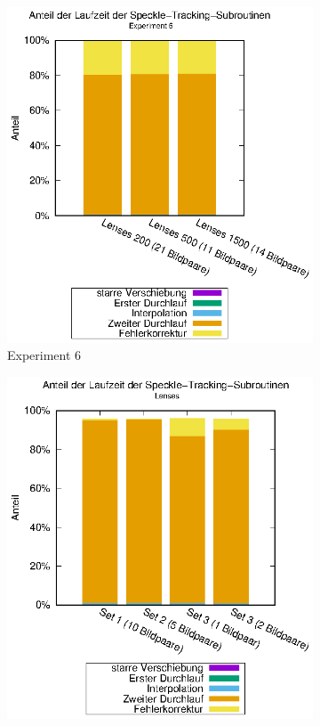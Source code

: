 \begin{center}
	\begin{figure}[h!]
		\begin{subfigure}[b]{0.5\textwidth}
			\centering
			\includegraphics[width=\textwidth]{pdf/speckle_exp6}
			\caption{Experiment 6}
			\label{fig:perc_speckle_exp6}
		\end{subfigure}
		\begin{subfigure}[b]{0.5\textwidth}
			\centering
			\includegraphics[width=\textwidth]{pdf/speckle_lenses}

\end{subfigure}
\end{figure}
\end{center}

